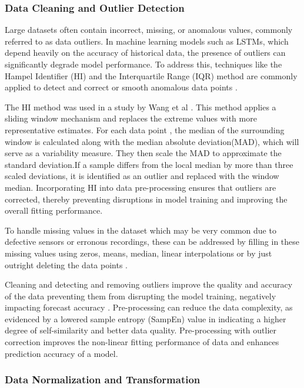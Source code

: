 \subsubsection{Data Cleaning and Outlier Detection}
Large datasets often contain incorrect, missing, or anomalous values, commonly referred to as data outliers. In machine learning models such as LSTMs, which depend heavily on the accuracy of historical data, the presence of outliers can significantly degrade model performance. To address this, techniques like the Hampel Identifier (HI) and the Interquartile Range (IQR) method are commonly applied to detect and correct or smooth anomalous data points \cite{hiceemdanQteg}.
 
The HI method was used in a study by Wang et al \cite{hiceemdanQteg}. This method applies a sliding window mechanism and replaces the extreme values with more representative estimates. For each data point , the median of the surrounding window is calculated along with the median absolute deviation(MAD), which will serve as a variability measure. They then scale the MAD to approximate the standard deviation.If a sample differs from the local median by more than three scaled deviations, it is identified as an outlier and replaced with the window median. Incorporating HI into data pre-processing ensures that outliers are corrected, thereby preventing disruptions in model training and improving the overall fitting performance.

To handle missing values in the dataset which may be very common due to defective sensors or erronous recordings, these can be addressed by filling in these missing values using zeros, means, median, linear interpolations or by just outright deleting the data points \cite{revathi2025short}.

Cleaning and detecting and removing outliers improve the quality and accuracy of the data preventing them from disrupting the model training, negatively impacting forecast accuracy \cite{hiceemdanQteg}. Pre-processing can reduce the data complexity, as evidenced by a lowered sample entropy (SampEn) value in \cite{hiceemdanQteg} indicating a higher degree of self-similarity and better data quality. Pre-processing with outlier correction improves the non-linear fitting performance of data and enhances prediction accuracy of a model.

\subsubsection{Data Normalization and Transformation}

